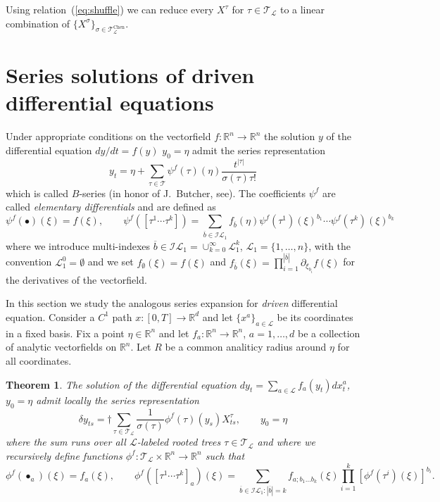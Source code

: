\documentclass[a4paper,11pt,reqno]{article}
\newcommand{\ol}[1]{\overline{#1}}
\newcommand{\1}{{\bf 1}}
\newcommand{\II}{\mathcal{I}}
\newcommand{\der}{\delta}
\newcommand{\RR}{\mathbb{R}}
\newcommand{\LL}{\mathcal{L}}
\newcommand{\cl}{\mathcal L}
\newtheorem{theorem}{Theorem}[section]
\newcommand{\TT}{\mathcal{T}}
\newcommand{\troot}{\bullet}
\begin{document}
Using relation~(\ref{eq:shuffle}) we can reduce every $X^{\tau}$ for $\tau \in \TT_\cl$ to a linear combination of $\{ X^{\sigma} \}_{\sigma \in \TT^{\text{Chen}}_\cl}$. 


\section{Series solutions of driven differential equations}
\label{sec:trees-diff}

Under appropriate conditions on the vectorfield $f: \RR^n \to \RR^n$
the solution $y$ of the differential equation $dy/dt = f(y)$ $y_0 =
\eta$ admit the series representation
\begin{equation}
  \label{eq:B-series}
y_t = \eta + \sum_{\tau \in \TT} \psi^f(\tau)(\eta)
\frac{t^{|\tau|}}{\sigma(\tau) \tau!}  
\end{equation}
which is called $B$-series (in honor of J.~Butcher,
see\cite{MR1993957,MR0403225,MR1227985}). The coefficients $\psi^f$ are called
\emph{elementary differentials} and are defined as
$$
\psi^f(\troot)(\xi) = f(\xi), \qquad \psi^f([\tau^1 \cdots \tau^k]) =
\sum_{\ol b \in \II\LL_1} f_{\ol b}(\eta)
\psi^f(\tau^1)(\xi)^{b_1}\cdots \psi^f(\tau^k)(\xi)^{b_k} 
$$ 
where we introduce multi-indexes $\overline b \in \II\LL_1 = \cup_{k=0}^\infty \LL_1^k$, $\LL_1 = \{1,\dots,n\}$, with the convention $\LL_1^0 = \emptyset$ and we set  $f_{\emptyset}(\xi) = f(\xi)$ and
$
f_{\ol b}(\xi) = \prod_{i=1}^{|\ol b|} \partial_{\xi_{b_i}} f(\xi)
$ for the derivatives of the vectorfield.
 
In this section we study the analogous series expansion for \emph{driven}
differential equation. 
Consider a $C^1$ path $x: [0,T] \to \RR^d$ and let $\{x^a\}_{a\in \LL}$ be its coordinates in a fixed basis. Fix a point $\eta \in \RR^n$ and let $f_a: \RR^n \to \RR^n$, $a=1,\dots,d$ be a collection of analytic vectorfields on $\RR^n$. Let $R$ be a common analiticy radius around $\eta$ for all coordinates.
\begin{theorem}
 The solution of the differential equation
$
 dy_t = \sum_{a\in\LL}  f_a(y_t) dx_t^a$, $y_0 = \eta
$  
admit locally the series representation
\begin{equation}
\label{eq:tree-rep}
\der y_{ts} = †\sum_{\tau \in \TT_\LL} \frac{1}{\sigma(\tau)} \phi^{f}(\tau)(y_s) X^\tau_{ts}, \qquad y_0 = \eta
\end{equation}
where the sum runs over all $\LL$-labeled rooted trees
$\tau\in\TT_\LL$
and where  we recursively define
functions $\phi^f : \TT_\LL \times \RR^n \to \RR^n$  such that
\begin{equation*}
\phi^f(\troot_a)(\xi) = f_a(\xi), \qquad
\phi^f([\tau^1 \cdots \tau^k]_a)(\xi) =  \sum_{\ol b  \in \II \LL_1: |\ol b| = k}
f_{a;b_1\dots b_k}(\xi) \prod_{i=1}^{k} [\phi^{f}(\tau^i)(\xi)]^{b_i}  .
\end{equation*}
\end{theorem}
\end{document}
